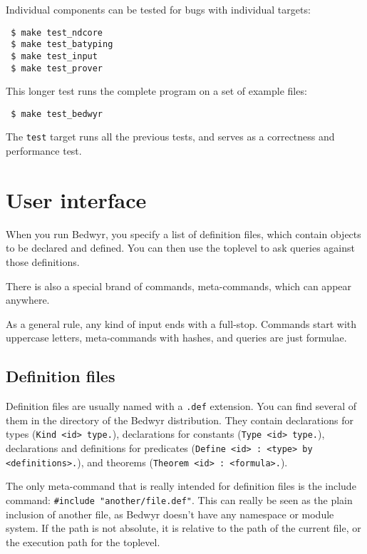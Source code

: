 Individual components can be tested for bugs with individual targets:

\begin{verbatim}
 $ make test_ndcore
 $ make test_batyping
 $ make test_input
 $ make test_prover
\end{verbatim}

This longer test runs the complete program on a set of example files:

\begin{verbatim}
 $ make test_bedwyr
\end{verbatim}

The \verb.test. target runs all the previous tests, and serves as a
correctness and performance test.


\section{User interface}

When you run Bedwyr, you specify a list of definition files, which
contain objects to be declared and defined.  You can then use the
toplevel to ask queries against those definitions.

There is also a special brand of commands, meta-commands, which can
appear anywhere.

As a general rule, any kind of input ends with a full-stop. Commands
start with uppercase letters, meta-commands with hashes, and queries
are just formulae.

\subsection{Definition files}

Definition files are usually named with a \verb|.def| extension.  You
can find several of them in the  directory of the Bedwyr
distribution.  They contain declarations for types
(\lstinline{Kind <id> type.}), declarations for constants
(\lstinline{Type <id> type.}), declarations and definitions for
predicates (\lstinline{Define <id> : <type> by <definitions>.}), and
theorems (\lstinline{Theorem <id> : <formula>.}).

The only meta-command that is really intended for definition files is
the include command: \lstinline{#include "another/file.def"}.  This can
really be seen as the plain inclusion of another file, as Bedwyr doesn't
have any namespace or module system.  If the path is not absolute, it is
relative to the path of the current file, or the execution path for the
toplevel.

